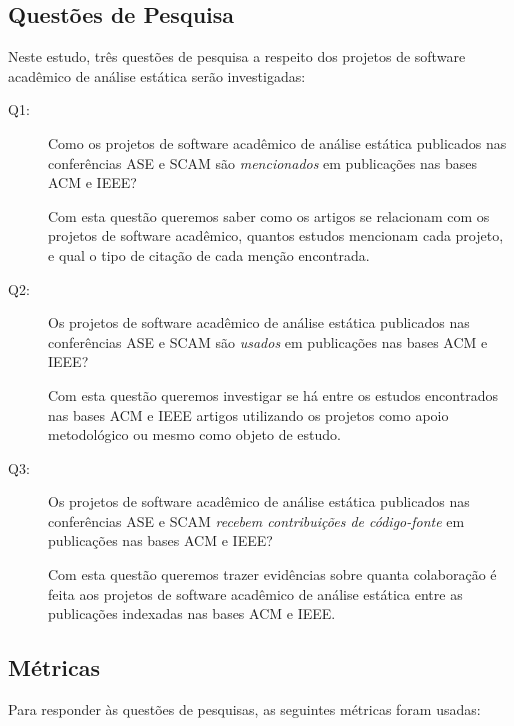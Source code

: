 \subsection{Questões de Pesquisa}

Neste estudo, três questões de pesquisa a respeito dos projetos de
software acadêmico de análise estática serão investigadas:

\newcommand{\EstudoDoisQuestaoUm}{
  Como os projetos de software acadêmico de análise estática publicados nas
  conferências ASE e SCAM são \textit{mencionados} em publicações nas bases ACM e IEEE?
}
\newcommand{\EstudoDoisQuestaoDois}{
  Os projetos de software acadêmico de análise estática publicados nas
  conferências ASE e SCAM são \textit{usados} em publicações nas bases ACM e IEEE?
}
\newcommand{\EstudoDoisQuestaoTres}{
  Os projetos de software acadêmico de análise estática publicados nas
  conferências ASE e SCAM \textit{recebem contribuições de código-fonte} em publicações
  nas bases ACM e IEEE?
}

\begin{description}
  \item [Q1:] \EstudoDoisQuestaoUm

    Com esta questão queremos saber como os artigos se relacionam com os projetos
    de software acadêmico, quantos estudos mencionam cada projeto, e qual o tipo
    de citação de cada menção encontrada.

  \item [Q2:] \EstudoDoisQuestaoDois

    Com esta questão queremos investigar se há entre os estudos encontrados nas bases
    ACM e IEEE artigos utilizando os projetos como apoio metodológico ou mesmo como
    objeto de estudo.

  \item [Q3:] \EstudoDoisQuestaoTres

    Com esta questão queremos trazer evidências sobre quanta colaboração é
    feita aos projetos de software acadêmico de análise estática entre as
    publicações indexadas nas bases ACM e IEEE.

\end{description}

\subsection{Métricas}

Para responder às questões de pesquisas, as seguintes métricas foram usadas:

